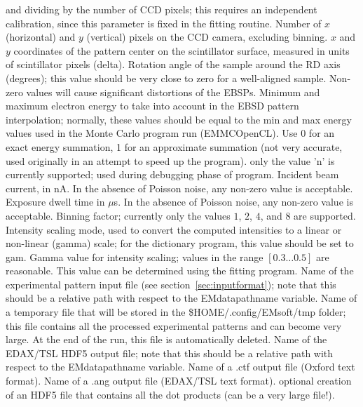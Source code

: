 \documentclass[DIV=calc, paper=letter, fontsize=11pt]{scrartcl}	 %
\begin{document}
\begin{itemize}
and dividing by the number of CCD pixels; this requires an independent calibration, since this parameter is fixed in the fitting routine.
 Number of $x$ (horizontal) and $y$ (vertical) pixels on the CCD camera, excluding binning.
 $x$ and $y$ coordinates of the pattern center on the scintillator surface, measured in units of scintillator pixels (\textsf{delta}). 
 Rotation angle of the sample around the RD axis (degrees); this value should be very close to zero for a well-aligned sample.  Non-zero values 
will cause significant distortions of the EBSPs.
 Minimum and maximum electron energy to take into account in the EBSD pattern interpolation; normally, these values should be equal to the min and max energy values used in the Monte Carlo program run (\textsf{EMMCOpenCL}).
 Use \textsf{0} for an exact energy summation, \textsf{1} for an approximate summation (not very accurate, used originally in an attempt to speed up the program).
 only the value \textsf{'n'} is currently supported; used during debugging phase of program.
 Incident beam current, in nA.  In the absence of Poisson noise, any non-zero value is acceptable.
 Exposure dwell time in $\mu$s.  In the absence of Poisson noise, any non-zero value is acceptable.
 Binning factor; currently only the values $1$, $2$, $4$, and $8$ are supported.
 Intensity scaling mode, used to convert the computed intensities to a linear or non-linear (gamma) scale; for the dictionary program, this value should be 
set to \textsf{gam}.
 Gamma value for intensity scaling; values in the range $[0.3\ldots 0.5]$ are reasonable.  This value can be determined using the fitting program.
 Name of the experimental pattern input file (see section~\ref{sec:inputformat}); note that this should be a relative path with respect to the \textsf{EMdatapathname} variable.
 Name of a temporary file that will be stored in the \textsf{\$HOME/.config/EMsoft/tmp} folder; this file contains all the processed experimental patterns and can become very large.  At the end of the run, this file is automatically deleted.
 Name of the EDAX/TSL HDF5 output file; note that this should be a relative path with respect to the \textsf{EMdatapathname} variable.
 Name of a .ctf output file (Oxford text format).
 Name of a .ang output file (EDAX/TSL text format).
 optional creation of an HDF5 file that contains all the dot products (can be a very large file!).

\end{itemize}
\end{document}
